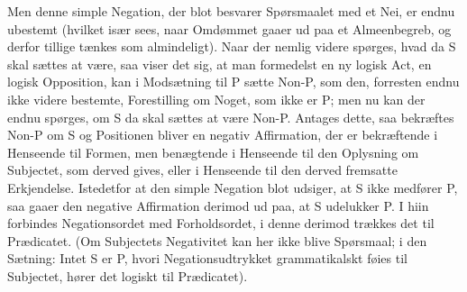 \documentclass[12pt]{book}
\def\textit#1{#1}%
\def\emph#1{#1}%
\newcommand{\opage}[1]{\marginnote{\footnotesize\textit{[#1]}}}
\begin{document}
Men denne simple \emph{Negation}, der blot besvarer Spørsmaalet med et Nei, er endnu
ubestemt (hvilket især sees, naar Omdømmet gaaer ud paa et Almeenbegreb, og derfor tillige
tænkes som almindeligt). Naar der nemlig videre spørges, hvad da \textit{S} skal sættes at
være, saa viser det sig, at man formedelst en ny logisk \emph{Act}, en logisk
\emph{Opposition}, kan i Modsætning til \textit{P} sætte \textit{Non-P}, som den, forresten
endnu ikke videre bestemte, Forestilling om Noget, som ikke er \textit{P}; men nu kan der
endnu spørges, om \textit{S} da skal sættes at være \textit{Non-P}. Antages dette, saa
bekræftes \textit{Non-P} om \textit{S} og Positionen bliver en negativ \emph{Affirmation},
der er bekræftende i Henseende til Formen, men benægtende i Henseende til den Oplysning om
Subjectet, som derved gives, eller i Henseende til den derved fremsatte
\opage{272} Erkjendelse. Istedetfor at den simple Negation blot udsiger, at \textit{S} ikke medfører
\textit{P}, saa gaaer den negative \emph{Affirmation} derimod ud paa, at \textit{S}
udelukker \textit{P}. I hiin forbindes \emph{Negationsordet} med Forholdsordet, i denne
derimod trækkes det til Prædicatet. (Om Subjectets Negativitet kan her ikke blive
Spørsmaal; i den Sætning: Intet \textit{S} er \textit{P}, hvori Negationsudtrykket
grammatikalskt føies til Subjectet, hører det logiskt til Prædicatet).
\end{document}
